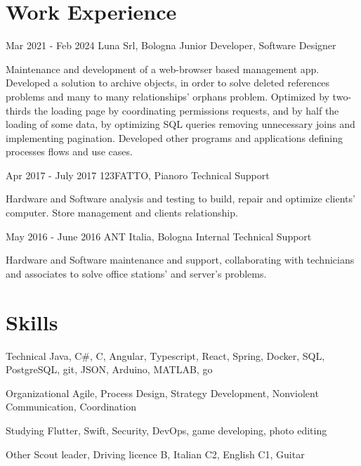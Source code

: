 \documentclass{tccv}
\begin{document}
\section{Work Experience}
\hfill
\begin{eventlist}

      \item{Mar 2021 - Feb 2024}
            {Luna Srl, Bologna}
            {Junior Developer, Software Designer}

      Maintenance and development of a web-browser based management app. Developed a solution to archive objects, in order to solve deleted references problems and many to many relationships' orphans problem.
      Optimized by two-thirds the loading page by coordinating permissions requests, and by half the loading of some data, by optimizing SQL queries removing unnecessary joins and implementing pagination.
      Developed other programs and applications defining processes flows and use cases.

      \item{Apr 2017 - July 2017}
            {123FATTO, Pianoro}
            {Technical Support}

      Hardware and Software analysis and testing to build, repair and optimize clients' computer. Store management and clients relationship.
      
      \item{May 2016 - June 2016}
            {ANT Italia, Bologna}
            {Internal Technical Support}

      Hardware and Software maintenance and support, collaborating with technicians and associates to solve office stations' and server's problems.
\end{eventlist}

\section{Skills}

\begin{factlist}
      \item{Technical}
            {Java, C\#, C, Angular, Typescript, React, Spring, Docker, SQL, PostgreSQL, git, JSON, Arduino, MATLAB, go}

      \item{Organizational}
            {Agile, Process Design, Strategy Development, Nonviolent Communication, Coordination}

      \item{Studying}
            {Flutter, Swift, Security, DevOps, game developing, photo editing}

      \item{Other}
            {Scout leader, Driving licence B, Italian C2, English C1, Guitar}
\end{factlist}
\end{document}
